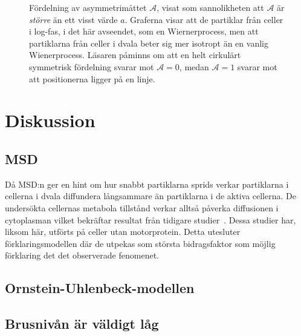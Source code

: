 \begin{figure}\centering

\caption{Fördelning av asymmetrimåttet $\mathcal{A}$, visat som sannolikheten att $\mathcal{A}$ är \emph{större} än ett visst värde $a$.
Graferna visar att de partiklar från celler i log-fas, i det här avseendet, som en Wiernerprocess, men att partiklarna från celler i dvala beter sig mer isotropt än en vanlig Wienerprocess. Läsaren påminns om att en helt cirkulärt symmetrisk fördelning svarar mot $\mathcal{A}=0$, medan $\mathcal{A}=1$ svarar mot att positionerna ligger på en linje.}
\label{fig:asymmetri}
\end{figure}



\section{Diskussion}

\subsection{MSD}
Då MSD:n ger en hint om hur snabbt partiklarna sprids verkar partiklarna i cellerna i dvala diffundera långsammare än partiklarna i de aktiva cellerna. De undersökta cellernas metabola tillstånd verkar alltså påverka diffusionen i cytoplasman vilket bekräftar resultat från tidigare studier~\cite{Parry_etal2014}. Dessa studier har, liksom här, utförts på celler utan motorprotein. Detta utesluter förklaringsmodellen där de utpekas som största bidragsfaktor som möjlig förklaring det det observerade fenomenet. 

\subsection{Ornstein-Uhlenbeck-modellen}

\subsection{Brusnivån är väldigt låg}





